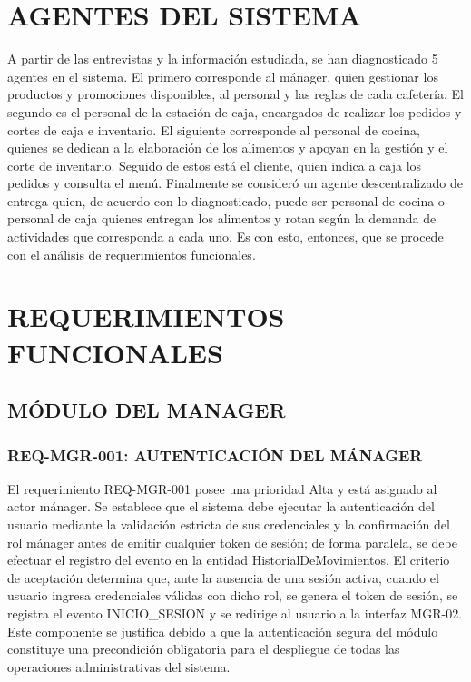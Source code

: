 \section{AGENTES DEL SISTEMA}
A partir de las entrevistas y la información estudiada, se han diagnosticado 5 agentes en el sistema. El primero corresponde al mánager, quien gestionar los productos y promociones disponibles, al personal y las reglas de cada cafetería. El segundo es el personal de la estación de caja, encargados de realizar los pedidos y cortes de caja e inventario. El siguiente corresponde al personal de cocina, quienes se dedican a la elaboración de los alimentos y apoyan en la gestión y el corte de inventario. Seguido de estos está el cliente, quien indica a caja los pedidos y consulta el menú. Finalmente se consideró un agente descentralizado de entrega quien, de acuerdo con lo diagnosticado, puede ser personal de cocina o personal de caja quienes entregan los alimentos y rotan según la demanda de actividades que corresponda a cada uno. Es con esto, entonces, que se procede con el análisis de requerimientos funcionales.

\section{REQUERIMIENTOS FUNCIONALES}

\subsection{MÓDULO DEL MANAGER}

\subsubsection{REQ-MGR-001: AUTENTICACIÓN DEL MÁNAGER}
El requerimiento REQ-MGR-001 posee una prioridad Alta y está asignado al actor mánager. Se establece que el sistema debe ejecutar la autenticación del usuario mediante la validación estricta de sus credenciales y la confirmación del rol mánager antes de emitir cualquier token de sesión; de forma paralela, se debe efectuar el registro del evento en la entidad HistorialDeMovimientos. El criterio de aceptación determina que, ante la ausencia de una sesión activa, cuando el usuario ingresa credenciales válidas con dicho rol, se genera el token de sesión, se registra el evento INICIO\_SESION y se redirige al usuario a la interfaz MGR-02. Este componente se justifica debido a que la autenticación segura del módulo constituye una precondición obligatoria para el despliegue de todas las operaciones administrativas del sistema.

